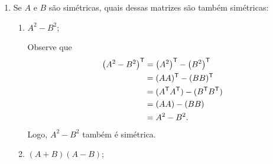 \documentclass[leqno]{article}
\numberwithin{equation}{section}
\begin{document}
\begin{enumerate}
\begin{enumerate}
                \end{enumerate}

            \item Se $A$ e $B$ são simétricas, quais dessas matrizes são também simétricas:

                \begin{enumerate}

                    \item $A^2 - B^2$;

                        \begin{sol} 
                            Observe que
                            \begin{align*}
                                \left(
                                    A^2 - B^2
                                \right)^{ \mathsf{T} }
                                &=
                                \left(
                                    A^2
                                \right)^{ \mathsf{T} }
                                -
                                \left(
                                    B^2
                                \right)^{ \mathsf{T} } \\
                                &= ( AA )^{ \mathsf{T} } - ( BB )^{ \mathsf{T} } \\
                                &= ( A^{ \mathsf{T} } A^{ \mathsf{T} } )
                                -
                                ( B^{ \mathsf{T} } B^{ \mathsf{T} } ) \\
                                &= ( AA ) - ( BB ) \\
                                &= A^2 - B^2
                            .\end{align*}
                            Logo, \( A^2 - B^2 \) também é simétrica.
                        \end{sol} 

                    \item $(A + B)(A - B)$;


\end{enumerate}
\end{enumerate}
\end{document}
